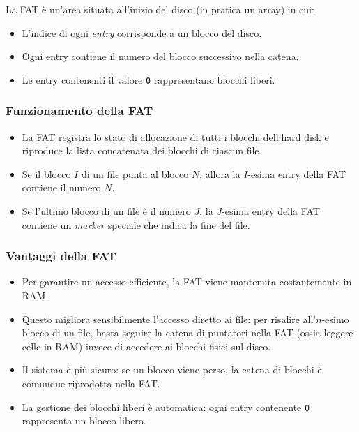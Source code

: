 La FAT è un’area situata all’inizio del disco (in pratica un array) in cui:
\begin{itemize}
    \item L’indice di ogni \textit{entry} corrisponde a un blocco del disco.
    \item Ogni entry contiene il numero del blocco successivo nella catena.
    \item Le entry contenenti il valore \texttt{0} rappresentano blocchi liberi.
\end{itemize}

\subsubsection{Funzionamento della FAT}
\begin{itemize}
    \item La FAT registra lo stato di allocazione di tutti i blocchi dell’hard disk e riproduce la lista concatenata dei blocchi di ciascun file.
    \item Se il blocco $I$ di un file punta al blocco $N$, allora la $I$-esima entry della FAT contiene il numero $N$.
    \item Se l’ultimo blocco di un file è il numero $J$, la $J$-esima entry della FAT contiene un \textit{marker} speciale che indica la fine del file.
\end{itemize}


\subsubsection{Vantaggi della FAT}
\begin{itemize}
    \item Per garantire un accesso efficiente, la FAT viene mantenuta costantemente in RAM.
    \item Questo migliora sensibilmente l’accesso diretto ai file: per risalire all’$n$-esimo blocco di un file, basta seguire la catena di puntatori nella FAT (ossia leggere celle in RAM) invece di accedere ai blocchi fisici sul disco.
    \item Il sistema è più sicuro: se un blocco viene perso, la catena di blocchi è comunque riprodotta nella FAT.
    \item La gestione dei blocchi liberi è automatica: ogni entry contenente \texttt{0} rappresenta un blocco libero.
\end{itemize}

